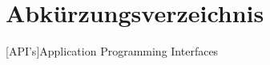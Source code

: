

\section*{Abkürzungsverzeichnis}

\begin{acronym}[API] %

\setlength{\itemsep}{-\parsep} %

[API's]{Application Programming Interfaces}

\end{acronym}
